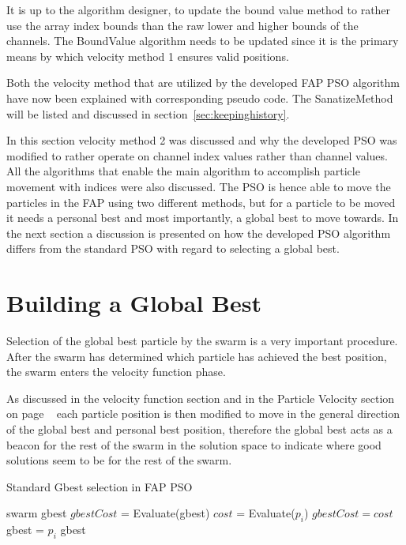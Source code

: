 It is up to the algorithm designer, to update the bound value method to rather use the array index bounds than the raw lower and higher bounds of the channels. The BoundValue algorithm needs to be updated since it is the primary means by which velocity method 1 ensures valid positions.

Both the velocity method that are utilized by the developed FAP PSO algorithm have now been explained with corresponding pseudo code. The SanatizeMethod will be listed and discussed in section~\ref{sec:keepinghistory}.

In this section velocity method 2 was discussed and why the developed PSO was modified to rather operate on channel index values rather than channel values. All the algorithms that enable the main algorithm to accomplish particle movement with indices were also discussed. The PSO is hence able to move the particles in the FAP using two different methods, but for a particle to be moved it needs a personal best and most importantly, a global best to move towards. In the next section a discussion is presented on how the developed PSO algorithm differs from the standard PSO with regard to selecting a global best.
\section{Building a Global Best}
\label{sec:buildglobalbest}
Selection of the global best particle by the swarm is a very important procedure. After the swarm has determined which particle has achieved the best position, the swarm enters the velocity function phase. 

As discussed in the velocity function section and in the Particle Velocity section on page ~\pageref{sec:particleVelocity} each particle position is then modified to move in the general direction of the global best and personal best position, therefore the global best acts as a beacon for the rest of the swarm in the solution space to indicate where good solutions seem to be for the rest of the swarm.

\begin{algorithm}
\caption{Standard Gbest selection in FAP PSO}
\label{alg:psogbestselection}
\begin{algorithmic}[1]
\REQUIRE swarm
\REQUIRE gbest
\STATE $gbestCost$ = Evaluate(gbest)
	\STATE $cost$ = Evaluate($p_i$)
		\STATE $gbestCost = cost$
		\STATE gbest = $p_i$
	\ENDIF
\ENDFOR
\RETURN gbest
\end{algorithmic}
\end{algorithm}

